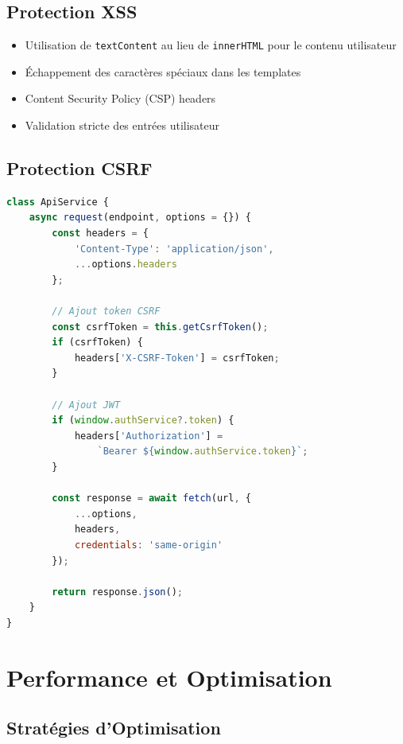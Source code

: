 \documentclass[12pt,a4paper]{article}
\begin{document}
\subsection{Protection XSS}

\begin{warningbox}
\begin{itemize}
    \item Utilisation de \texttt{textContent} au lieu de \texttt{innerHTML} pour le contenu utilisateur
    \item Échappement des caractères spéciaux dans les templates
    \item Content Security Policy (CSP) headers
    \item Validation stricte des entrées utilisateur
\end{itemize}
\end{warningbox}

\subsection{Protection CSRF}

\begin{lstlisting}[language=JavaScript,caption=CSRF token (api-service.js)]
class ApiService {
    async request(endpoint, options = {}) {
        const headers = {
            'Content-Type': 'application/json',
            ...options.headers
        };
        
        // Ajout token CSRF
        const csrfToken = this.getCsrfToken();
        if (csrfToken) {
            headers['X-CSRF-Token'] = csrfToken;
        }
        
        // Ajout JWT
        if (window.authService?.token) {
            headers['Authorization'] = 
                `Bearer ${window.authService.token}`;
        }
        
        const response = await fetch(url, {
            ...options,
            headers,
            credentials: 'same-origin'
        });
        
        return response.json();
    }
}
\end{lstlisting}

\section{Performance et Optimisation}

\subsection{Stratégies d'Optimisation}
\end{document}

